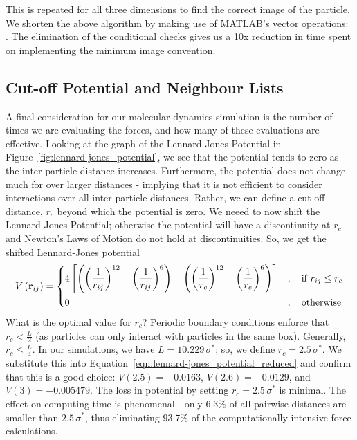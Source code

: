 \documentclass[../Main.tex]{subfiles}
\begin{document}
This is repeated for all three dimensions to find the correct image of the particle.
We shorten the above algorithm by making use of MATLAB's vector operations: . The elimination of the conditional checks gives us a 10x reduction in time spent on implementing the minimum image convention.

\subsection{Cut-off Potential and Neighbour Lists}

A final consideration for our molecular dynamics simulation is the number of times we are evaluating the forces, and how many of these evaluations are effective. Looking at the graph of the Lennard-Jones Potential in Figure~\ref{fig:lennard-jones_potential}, we see that the potential tends to zero as the inter-particle distance increases. Furthermore, the potential does not change much for over larger distances - implying that it is not efficient to consider interactions over all inter-particle distances. Rather, we can define a cut-off distance, $r_{c}$ beyond which the potential is zero. We neeed to now shift the Lennard-Jones Potential; otherwise the potential will have a discontinuity at $r_{c}$ and Newton's Laws of Motion do not hold at discontinuities. So, we get the shifted Lennard-Jones potential
\begin{align}
	V\left(\vec{r}_{ij}\right) = \begin{dcases}
			4 \left[ \left(\left( \frac{1}{r_{ij}}\right)^{12} - \left( \frac{1}{r_{ij}}\right)^{6}\right) - \Bigg(\bigg( \frac{1}{r_{c}}\bigg)^{12} - \bigg( \frac{1}{r_{c}}\bigg)^{6}\Bigg) \right]&,\quad  \mbox{if } r_{ij} \leq r_{c} \\
			0&,\quad \mbox{otherwise} 
	\end{dcases} \label{eqn:lennard-jones_potential_reduced_shifted}
\end{align}
What is the optimal value for $r_{c}$? Periodic boundary conditions enforce that $r_{c} < \frac{L}{2}$ (as particles can only interact with particles in the same box). Generally, $r_{c} \leq \frac{L}{4}$\cite{FrenkelSmit2001}. In our simulations, we have $L = 10.229\,\sigma^{*}$; so, we define $r_{c} = 2.5\,\sigma^{*}$. We substitute this into Equation~\ref{eqn:lennard-jones_potential_reduced} and confirm that this is a good choice: $V(2.5) = -0.0163$, $V(2.6) = -0.0129$, and $V(3) = -0.005479$. The  loss in potential by setting $r_{c} = 2.5\,\sigma^{*}$ is minimal. The effect on computing time is phenomenal - only $6.3\%$ of all pairwise distances are smaller than $2.5\,\sigma^{*}$, thus eliminating $93.7\%$ of the computationally intensive force calculations.
\end{document}
